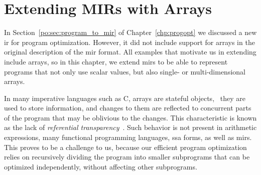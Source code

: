 \section{Extending MIRs with Arrays}
\label{lo:sec:intermediate}


In Section~\ref{po:sec:program_to_mir} of Chapter~\ref{chp:progopt} we
discussed a new \gls{ir} for program optimization.  However, it did not include
support for arrays in the original description of the \gls{mir} format.  All
examples that motivate us in extending \soap{} include arrays, so in this
chapter, we extend \glspl{mir} to be able to represent programs that not only
use scalar values, but also single- or multi-dimensional arrays.

In many imperative languages such as C, arrays are stateful objects, \ie~they
are used to store information, and changes to them are reflected to concurrent
parts of the program that may be oblivious to the changes.  This characteristic
is known as the lack of \emph{referential transparency}~\cite{sondergaard90}.
Such behavior is not present in arithmetic expressions, many functional
programming languages, \gls{ssa} forms, as well as \glspl{mir}.  This proves
to be a challenge to us, because our efficient program optimization relies on
recursively dividing the program into smaller subprograms that can be optimized
independently, without affecting other subprograms.

